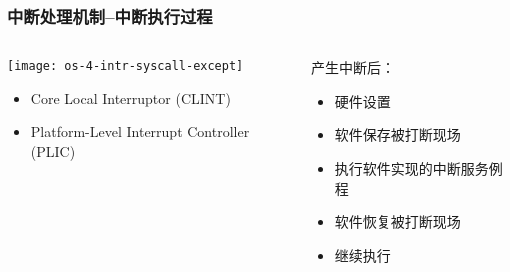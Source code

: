 \begin{frame}[plain,t]
	\frametitle{中断处理机制--中断执行过程}
	\begin{columns}
		
		\begin{column}{0.4\textwidth}
			\centering
			\texttt{[image: os-4-intr-syscall-except]}
			\begin{itemize} \small
				\item Core Local	Interruptor (CLINT)
				\item Platform-Level Interrupt Controller (PLIC)
			\end{itemize}
			
		\end{column}
		
		\begin{column}{0.5\textwidth}
			
			\centering
			产生中断后：
			\begin{itemize} \small 
				\item 硬件设置
				\item 软件保存被打断现场\pause
				\item 执行软件实现的中断服务例程
				\item 软件恢复被打断现场
				\item 继续执行
				
			\end{itemize}
			
		\end{column}
		
	\end{columns}
	
\end{frame}	


